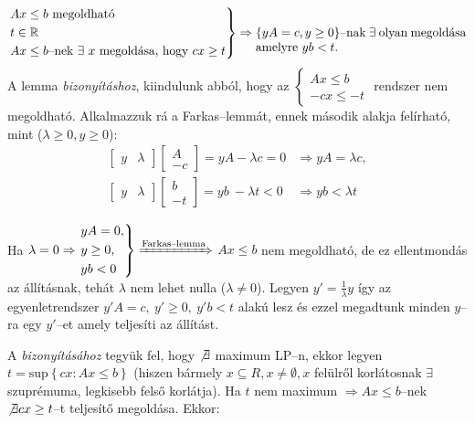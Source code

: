 \[
\begin{rcases}
Ax \leq b \mbox{ megoldható} \\
t \in \mathbb{R} \\
Ax \leq b \mbox{--nek } \exists~x \mbox{ megoldása, hogy } cx \geq t
\end{rcases} \Rightarrow
\parbox[t]{6cm}{
$\{yA=c, y \geq 0\}$--nak $\exists$ olyan megoldása amelyre  $yb < t$.}
\]
A lemma \emph{bizonyításhoz}, kiindulunk abból, hogy az $\begin{cases}
Ax \leq b \\
-cx \leq -t
\end{cases}$ rendszer nem megoldható. Alkalmazzuk rá a Farkas--lemmát, ennek második
alakja felírható, mint ($\lambda \geq 0, y \geq 0$):
\begin{align*}
\begin{bmatrix} y & \lambda\end{bmatrix}
\begin{bmatrix} A \\ -c \end{bmatrix} = yA - \lambda c = 0 &\Rightarrow 
yA = \lambda c, \\
\begin{bmatrix} y & \lambda\end{bmatrix}
\begin{bmatrix} b \\ -t \end{bmatrix} =yb~ - \lambda t < 0 &\Rightarrow 
yb < \lambda t
\end{align*}

Ha $\lambda=0 \Rightarrow \begin{rcases}
yA = 0, \\
y \geq 0, \\
yb <  0 \end{rcases} \xRightarrow{\text{Farkas--lemma}}$ $Ax \leq b$ nem
megoldható, de ez ellentmondás az állításnak, tehát $\lambda$ nem lehet nulla
($\lambda \neq 0$). Legyen $y'=\frac{1}{\lambda}y$ így az egyenletrendszer
$y'A=c,~y'\geq0,~y'b<t$ alakú lesz és ezzel megadtunk minden $y$--ra egy
$y'$--et amely teljesíti az állítást.

A  \emph{bizonyításához} tegyük fel, hogy $\not \exists$ maximum
LP--n, ekkor legyen $t=\mbox{sup}\left\{cx:Ax \leq b \right\}$ (hiszen bármely
$x \subseteq R, x \neq \emptyset, x$ felülről korlátosnak $\exists$ szuprémuma,
legkisebb felső korlátja). Ha $t$ nem maximum $\Rightarrow Ax \leq b$--nek $\not
\exists cx \geq t$--t teljesítő megoldása. Ekkor:

